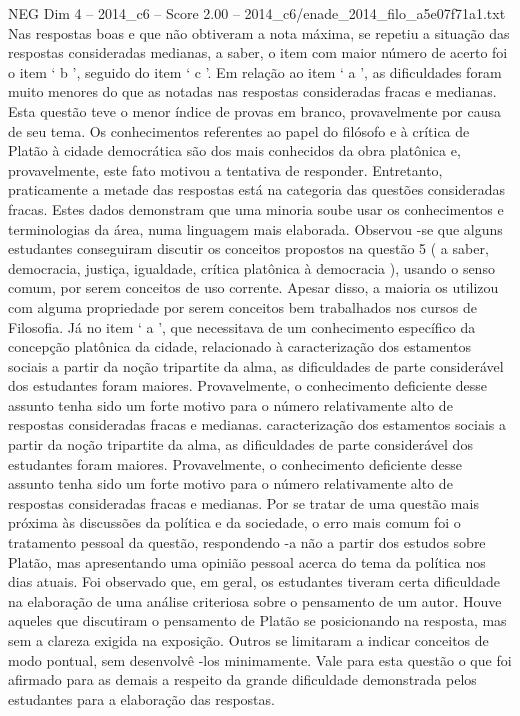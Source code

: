 \begin{textsample}{NEG Dim 4 – 2014\_c6 – Score 2.00 – 2014\_c6/enade\_2014\_filo\_a5e07f71a1.txt}
Nas respostas boas e que não obtiveram a nota máxima, se repetiu a situação das respostas consideradas medianas, a saber, o item com maior número de acerto foi o item ‘ b ’, seguido do item ‘ c ’.
Em relação ao item ‘ a ’, as dificuldades foram muito menores do que as notadas nas respostas consideradas fracas e medianas.
Esta questão teve o menor índice de provas em branco, provavelmente por causa de seu tema.
Os conhecimentos referentes ao papel do filósofo e à crítica de Platão à cidade democrática são dos mais conhecidos da obra platônica e, provavelmente, este fato motivou a tentativa de responder.
Entretanto, praticamente a metade das respostas está na categoria das questões consideradas fracas.
Estes dados demonstram que uma minoria soube usar os conhecimentos e terminologias da área, numa linguagem mais elaborada.
Observou -se que alguns estudantes conseguiram discutir os conceitos propostos na questão 5 ( a saber, democracia, justiça, igualdade, crítica platônica à democracia ), usando o senso comum, por serem conceitos de uso corrente.
Apesar disso, a maioria os utilizou com alguma propriedade por serem conceitos bem trabalhados nos cursos de Filosofia.
Já no item ‘ a ’, que necessitava de um conhecimento específico da concepção platônica da cidade, relacionado à caracterização dos estamentos sociais a partir da noção tripartite da alma, as dificuldades de parte considerável dos estudantes foram maiores.
Provavelmente, o conhecimento deficiente desse assunto tenha sido um forte motivo para o número relativamente alto de respostas consideradas fracas e medianas. caracterização dos estamentos sociais a partir da noção tripartite da alma, as dificuldades de parte considerável dos estudantes foram maiores.
Provavelmente, o conhecimento deficiente desse assunto tenha sido um forte motivo para o número relativamente alto de respostas consideradas fracas e medianas.
Por se tratar de uma questão mais próxima às discussões da política e da sociedade, o erro mais comum foi o tratamento pessoal da questão, respondendo -a não a partir dos estudos sobre Platão, mas apresentando uma opinião pessoal acerca do tema da política nos dias atuais.
Foi observado que, em geral, os estudantes tiveram certa dificuldade na elaboração de uma análise criteriosa sobre o pensamento de um autor.
Houve aqueles que discutiram o pensamento de Platão se posicionando na resposta, mas sem a clareza exigida na exposição.
Outros se limitaram a indicar conceitos de modo pontual, sem desenvolvê -los minimamente.
Vale para esta questão o que foi afirmado para as demais a respeito da grande dificuldade demonstrada pelos estudantes para a elaboração das respostas.

\end{textsample}
